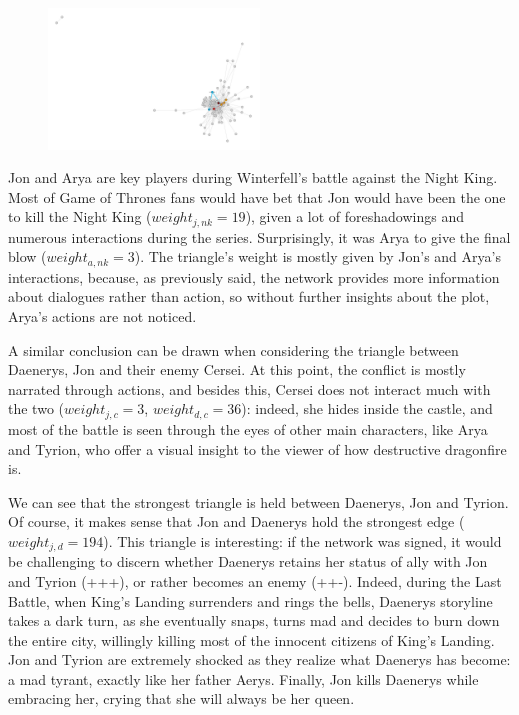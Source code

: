 \documentclass[10pt,twocolumn,letterpaper]{article}
\begin{document}
\begin{figure}[!h]
    \includegraphics[width=0.5\textwidth]{img/s8/s8_triangles.jpg}
\end{figure}

Jon and Arya are key players during Winterfell's battle against the Night King. Most of Game of Thrones fans would have bet that Jon would have been the one to kill the Night King ($weight_{j,nk}=19$), given a lot of foreshadowings and numerous interactions during the series. Surprisingly, it was Arya to give the final blow ($weight_{a,nk}=3$). The triangle's weight is mostly given by Jon's and Arya's interactions, because, as previously said, the network provides more information about dialogues rather than action, so without further insights about the plot, Arya's actions are not noticed. 

A similar conclusion can be drawn when considering the triangle between Daenerys, Jon and their enemy Cersei. At this point, the conflict is mostly narrated through actions, and besides this, Cersei does not interact much with the two ($weight_{j,c}=3$, $weight_{d,c}=36$): indeed, she hides inside the castle, and most of the battle is seen through the eyes of other main characters, like Arya and Tyrion, who offer a visual insight to the viewer of how destructive dragonfire is.

We can see that the strongest triangle is held between Daenerys, Jon and Tyrion. Of course, it makes sense that Jon and Daenerys hold the strongest edge ($weight_{j,d}=194$). This triangle is interesting: if the network was signed, it would be challenging to discern whether Daenerys retains her status of ally with Jon and Tyrion (+++), or rather becomes an enemy (++-). Indeed, during the Last Battle, when King's Landing surrenders and rings the bells, Daenerys storyline takes a dark turn, as she eventually snaps, turns mad and decides to burn down the entire city, willingly killing most of the innocent citizens of King's Landing. Jon and Tyrion are extremely shocked as they realize what Daenerys has become: a mad tyrant, exactly like her father Aerys. Finally, Jon kills Daenerys while embracing her, crying that she will always be her queen.
\end{document}
